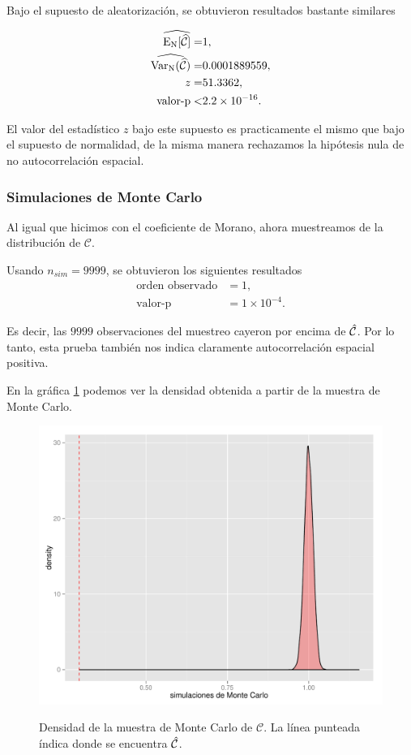 Bajo el supuesto de aleatorización, se obtuvieron resultados bastante similares

\begin{align*}
\widehat{{\rm{E_N}} [\widehat{\mathcal{C}}]} =& 1,  \\ 
\widehat{{\rm{Var_N}}(\widehat{\mathcal{C}})} =& 0.0001889559,  \\
z =& 51.3362, \\
\mbox{valor-p} <& 2.2 \times 10^{-16}.
\end{align*}

El valor del estadístico $z$ bajo este supuesto es practicamente el mismo que bajo el supuesto de normalidad, de la misma manera rechazamos la hipótesis nula de no autocorrelación espacial.
\subsubsection{Simulaciones de Monte Carlo}
Al igual que hicimos con el coeficiente de Morano, ahora muestreamos  de la distribución de $\mathcal{C}$. 

Usando $n_{sim}=9999$, se obtuvieron los siguientes resultados
\begin{align*}
\mbox{orden observado} &= 1,\\
\mbox{valor-p} &= 1\times 10^{-4}.
\end{align*}

Es decir, las  $9999$ observaciones del muestreo cayeron por encima de $\Hat{\mathcal{C}}$. Por lo tanto, esta prueba también nos indica claramente autocorrelación espacial positiva.

En la gráfica \ref{obj:gearydensity} podemos ver la densidad obtenida a partir de la muestra de Monte Carlo. 

\begin{figure}[!ht]
\centering
\includegraphics[width=.6\textwidth]{./plots/geary_density.pdf} \\
\caption{Densidad de la muestra de Monte Carlo de $\mathcal{C}$. La línea punteada índica donde se encuentra $\Hat{\mathcal{C}}$.}
\label{obj:gearydensity}  
\end{figure}


